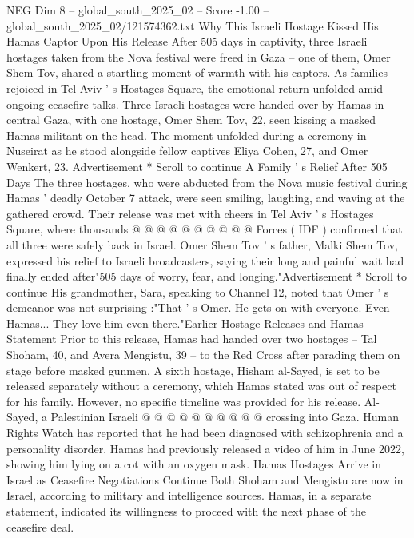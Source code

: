 \begin{textsample}{NEG Dim 8 – global\_south\_2025\_02 – Score -1.00 – global\_south\_2025\_02/121574362.txt}  \label{ex:f8_neg_374}
Why This Israeli Hostage Kissed His Hamas Captor Upon His Release After 505 days in captivity, three Israeli hostages taken from the Nova festival were freed in Gaza -- one of them, Omer Shem Tov, shared a startling moment of warmth with his captors.
As families rejoiced in Tel Aviv ' s Hostages Square, the emotional return unfolded amid ongoing ceasefire talks.
Three Israeli hostages were handed over by Hamas in central Gaza, with one hostage, Omer Shem Tov, 22, seen kissing a masked Hamas militant on the head.
The moment unfolded during a ceremony in Nuseirat as he stood alongside fellow captives Eliya Cohen, 27, and Omer Wenkert, 23.
Advertisement * Scroll to continue A Family ' s Relief After 505 Days The three hostages, who were abducted from the Nova music festival during Hamas ' deadly October 7 attack, were seen smiling, laughing, and waving at the gathered crowd.
Their release was met with cheers in Tel Aviv ' s Hostages Square, where thousands @ @ @ @ @ @ @ @ @ @ Forces ( IDF ) confirmed that all three were safely back in Israel.
Omer Shem Tov ' s father, Malki Shem Tov, expressed his relief to Israeli broadcasters, saying their long and painful wait had finally ended after"505 days of worry, fear, and longing."Advertisement * Scroll to continue His grandmother, Sara, speaking to Channel 12, noted that Omer ' s demeanor was not surprising :"That ' s Omer.
He gets on with everyone.
Even Hamas...
They love him even there."Earlier Hostage Releases and Hamas Statement Prior to this release, Hamas had handed over two hostages -- Tal Shoham, 40, and Avera Mengistu, 39 -- to the Red Cross after parading them on stage before masked gunmen.
A sixth hostage, Hisham al-Sayed, is set to be released separately without a ceremony, which Hamas stated was out of respect for his family.
However, no specific timeline was provided for his release.
Al-Sayed, a Palestinian Israeli @ @ @ @ @ @ @ @ @ @ crossing into Gaza.
Human Rights Watch has reported that he had been diagnosed with schizophrenia and a personality disorder.
Hamas had previously released a video of him in June 2022, showing him lying on a cot with an oxygen mask.
Hamas Hostages Arrive in Israel as Ceasefire Negotiations Continue Both Shoham and Mengistu are now in Israel, according to military and intelligence sources.
Hamas, in a separate statement, indicated its willingness to proceed with the next phase of the ceasefire deal.

\end{textsample}
